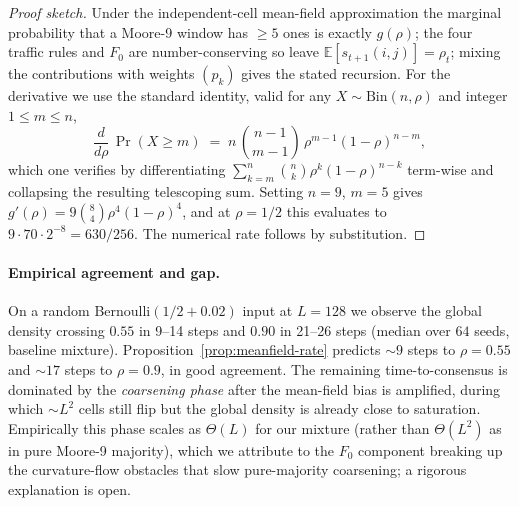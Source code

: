 \documentclass[11pt,a4paper]{article}
\begin{document}
\begin{proof}[Proof sketch]
Under the independent-cell mean-field approximation the marginal
probability that a Moore-9 window has \(\geq 5\) ones is exactly
\(g(\rho)\); the four traffic rules and \(F_0\) are number-conserving
so leave \(\mathbb{E}[s_{t+1}(i,j)] = \rho_t\); mixing the
contributions with weights \((p_k)\) gives the stated recursion.
For the derivative we use the standard identity, valid for any
\(X \sim \mathrm{Bin}(n, \rho)\) and integer \(1 \leq m \leq n\),
\[
\frac{d}{d\rho}\,\Pr(X \geq m)
\;=\;
n\,\binom{n-1}{m-1}\,\rho^{m-1}(1-\rho)^{n-m},
\]
which one verifies by differentiating
\(\sum_{k=m}^{n} \binom{n}{k}\rho^k(1-\rho)^{n-k}\) term-wise and
collapsing the resulting telescoping sum.  Setting \(n = 9\),
\(m = 5\) gives
\(g'(\rho) = 9\binom{8}{4}\rho^{4}(1-\rho)^{4}\), and at \(\rho=1/2\)
this evaluates to \(9 \cdot 70 \cdot 2^{-8} = 630/256\).  The numerical
rate follows by substitution.
\end{proof}

\paragraph{Empirical agreement and gap.}
On a random Bernoulli\((1/2 + 0.02)\) input at \(L = 128\) we observe
the global density crossing \(0.55\) in 9--14 steps and \(0.90\) in
21--26 steps (median over \(64\) seeds, baseline mixture).
Proposition~\ref{prop:meanfield-rate} predicts \(\sim 9\) steps to
\(\rho = 0.55\) and \(\sim 17\) steps to \(\rho = 0.9\), in good
agreement.  The remaining time-to-consensus is dominated by the
\emph{coarsening phase} after the mean-field bias is amplified,
during which \(\sim L^2\) cells still flip but the global density is
already close to saturation.  Empirically this phase scales as
\(\Theta(L)\) for our mixture (rather than \(\Theta(L^2)\) as in pure
Moore-9 majority), which we attribute to the \(F_0\) component
breaking up the curvature-flow obstacles that slow pure-majority
coarsening; a rigorous explanation is open.
\end{document}
